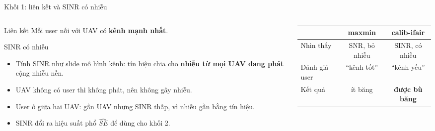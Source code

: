 \documentclass[aspectratio=169,10pt,t]{beamer}
\newcommand{\good}[1]{\textcolor{Good}{\textbf{#1}}}
\newcommand{\hl}[1]{\textcolor{MainBlue}{\textbf{#1}}}
\newcommand{\SE}{\widehat{SE}}
\begin{document}
\begin{frame}{Khối 1: liên kết và SINR có nhiễu}
\begin{columns}[T,onlytextwidth]
\begin{column}{0.52\textwidth}
\vspace{0pt}
  \begin{block}{Liên kết}
    \small Mỗi user nối với UAV có \hl{kênh mạnh nhất}.
  \end{block}
  \begin{block}{SINR có nhiễu}
    \small
    \begin{itemize}
      \item Tính SINR như slide mô hình kênh: tín hiệu chia cho \textbf{nhiễu từ mọi UAV đang phát} cộng nhiễu nền.
      \item UAV không có user thì không phát, nên không gây nhiễu.
      \item User ở giữa hai UAV: gần UAV nhưng SINR \alert{thấp}, vì nhiễu gần bằng tín hiệu.
      \item SINR đổi ra hiệu suất phổ $\SE$ để dùng cho khối 2.
    \end{itemize}
  \end{block}
\end{column}
\begin{column}{0.44\textwidth}
\vspace{0pt}
  \centering

  \scriptsize
  \begin{tabular}{@{}lcc@{}}
    \toprule
    & \textbf{maxmin} & \hl{calib-ifair}\\
    \midrule
    Nhìn thấy & SNR, bỏ nhiễu & SINR, có nhiễu\\
    Đánh giá user & ``kênh tốt'' & \alert{``kênh yếu''}\\
    Kết quả & ít băng & \good{được bù băng}\\
    \bottomrule
  \end{tabular}

\end{column}
\end{columns}
\end{frame}
\end{document}
